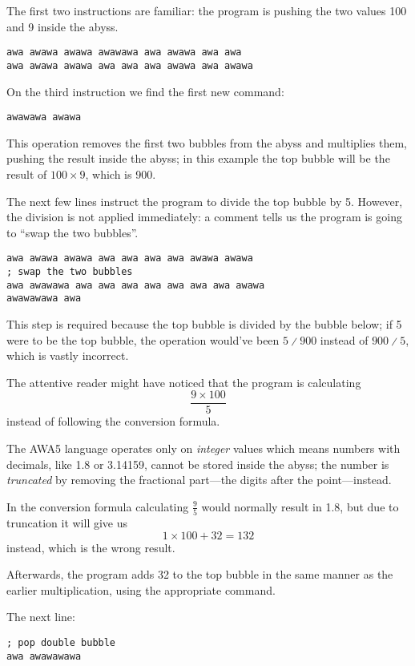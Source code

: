 \documentclass[11pt,a4paper,draft]{book}
\begin{document}
The first two instructions are familiar: the program is pushing the
two values \num{100} and \num{9} inside the abyss.

\begin{verbatim}
awa awawa awawa awawawa awa awawa awa awa
awa awawa awawa awa awa awa awawa awa awawa
\end{verbatim}

On the third instruction we find the first new command:

\begin{verbatim}
awawawa awawa
\end{verbatim}

This operation removes the first two bubbles from the
abyss and multiplies them, pushing the result inside the abyss; in
this example the top bubble will be the result of \(100 \times 9\),
which is \num{900}.

The next few lines instruct the program to divide the top bubble by
\num{5}. However, the division is not applied immediately: a comment
tells us the program is going to \enquote{swap the two bubbles}.

\begin{verbatim}
awa awawa awawa awa awa awa awa awawa awawa
; swap the two bubbles
awa awawawa awa awa awa awa awa awa awa awawa
awawawawa awa
\end{verbatim}

This step is required because the top bubble is divided by the bubble
below; if \num{5} were to be the top bubble, the operation would've
been \(5 \divslash 900\) instead of \(900 \divslash 5\), which is
vastly incorrect.

The attentive reader might have noticed that the program is
calculating \[\frac{9 \times 100}{5}\] instead of following the
conversion formula.

The AWA5 language operates only on \emph{integer} values which means
numbers with decimals, like \num{1.8} or \num{3.14159}, cannot be
stored inside the abyss; the number is \emph{truncated} by removing
the fractional part---the digits after the point---instead.

In the conversion formula calculating \(\frac{9}{5}\) would normally
result in \num{1.8}, but due to truncation it will give us \[1 \times
100 + 32 = 132\] instead, which is the wrong result.

Afterwards, the program adds \num{32} to the top bubble in the
same manner as the earlier multiplication, using the appropriate
command.

The next line:
\begin{verbatim}
; pop double bubble
awa awawawawa
\end{verbatim}
\end{document}
